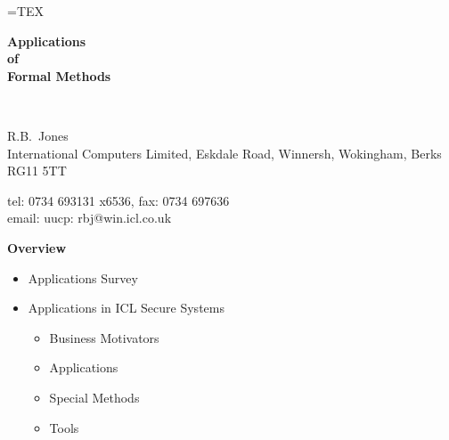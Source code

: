=TEX
\begin{slide}{}
\begin{center}
{\bf Applications\\
of\\
Formal Methods}

\ 

\small{R.B.~Jones \\
International Computers Limited,
Eskdale Road,
Winnersh,
Wokingham,
Berks RG11 5TT

tel: 0734 693131 x6536,
fax: 0734 697636\\
email: uucp: rbj@win.icl.co.uk}
\end{center}
\end{slide}

\begin{slide}{}

\begin{center}
{\bf {Overview}}
\end{center}

\begin{itemize}
\item
Applications Survey
\item
Applications in ICL Secure Systems
\begin{itemize}
\item
Business Motivators
\item
Applications
\item
Special Methods
\item
Tools
\end{itemize}
\end{itemize}

\end{slide}

